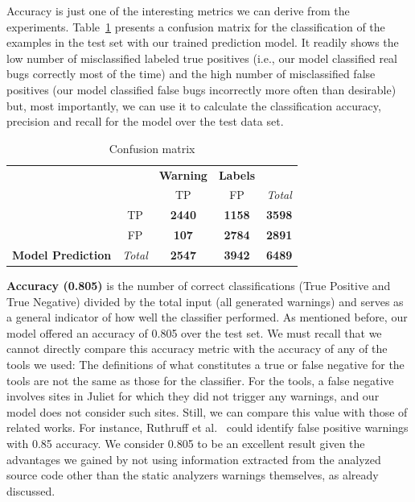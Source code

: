 Accuracy is just one of the interesting metrics we can derive from the experiments.
Table~\ref{tab:matrix} presents a confusion matrix for the classification of
the examples in the test set with our trained prediction model. It readily
shows the low number of misclassified labeled true positives (i.e., our model
classified real bugs correctly most of the time) and the high number of
misclassified false positives (our model classified false bugs incorrectly
more often than desirable) but, most importantly,
we can use it to calculate the classification accuracy, precision and recall for the
model over the test data set.


\begin{table}
  \begin{center}
\begin{tabular}{|c|c|c|c|c|}
\hline
                                            &                                        & \textbf{Warning}                      & \textbf{Labels}                       &                                        \\ 
                                            &                                        & TP                                    & FP                                    & \textit{Total} \\ 
                                            & TP                                     & \textbf{2440}                         & \textbf{1158}                         & \textbf{3598}  \\ 
                                            & FP                                     & \textbf{107}                          & \textbf{2784}                         & \textbf{2891}  \\ 
\multirow{-5}{*}{\textbf{Model Prediction}} & \textit{Total} & \textbf{2547} & \textbf{3942} & \textbf{6489}  \\ \hline
\end{tabular}
\caption{Confusion matrix}\label{tab:matrix}
\end{center}
\end{table}


\textbf{Accuracy (0.805)} is the number of correct classifications
    (True Positive and True Negative) divided by the total input (all
    generated warnings) and serves as a general indicator of how well
    the classifier performed. As mentioned before, our model offered an
    accuracy of 0.805 over the test set. We must recall that we cannot
    directly compare
    this accuracy metric with the accuracy of any of the tools we used:
    The definitions of what constitutes a true or false
    negative for the tools are not the same as those for the classifier.
    For the tools, a false negative involves
    sites in Juliet for which they did not trigger any warnings,
    and our model does not consider such sites. Still, we can
    compare this value with those of related works. For instance, Ruthruff et al.~\cite{ruthruff_predicting_2008} could
    identify false positive warnings with 0.85 accuracy. We consider 0.805 to
    be an excellent result given the advantages we gained by not using information extracted from
    the analyzed source code other than the static analyzers warnings
    themselves, as already discussed.

